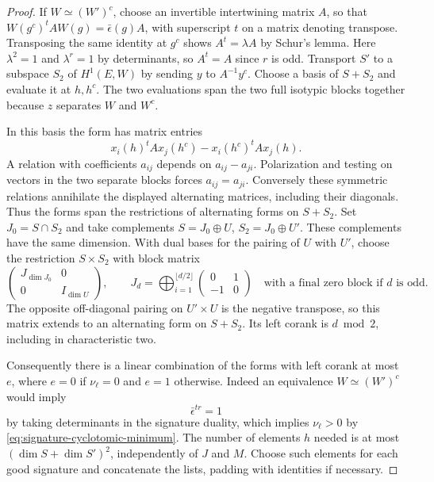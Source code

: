 \begin{proof}
If \(W\simeq(W')^c\), choose an invertible intertwining
matrix \(A\), so that
\(W(g^c)^t A W(g)=\bar\epsilon(g) A\), with superscript
\(t\) on a matrix denoting transpose. Transposing the same
identity at \(g^c\) shows \(A^t=\lambda A\) by Schur's lemma.
Here \(\lambda^2=1\) and \(\lambda^r=1\) by determinants, so
\(A^t=A\) since \(r\) is odd. Transport \(S'\) to a subspace
\(S_2\) of \(H^1(E,W)\) by sending \(y\) to \(A^{-1}y^c\).
Choose a basis of \(S+S_2\) and evaluate it at \(h,h^c\).
The two evaluations span the two full isotypic blocks together
because \(z\) separates \(W\) and \(W^c\).

In this basis the
form has matrix entries
\[
     x_i(h)^t A x_j(h^c)-x_i(h^c)^t A x_j(h).
\]
A relation with coefficients \(a_{ij}\) depends on
\(a_{ij}-a_{ji}\). Polarization and testing on vectors in
the two separate blocks forces \(a_{ij}=a_{ji}\). Conversely
these symmetric relations annihilate the displayed alternating
matrices, including their diagonals. Thus the forms span the restrictions of alternating forms on
\(S+S_2\). Set \(J_0=S\cap S_2\) and take complements
\(S=J_0\oplus U\), \(S_2=J_0\oplus U'\). These complements
have the same dimension. With dual bases for the pairing
of \(U\) with \(U'\), choose the restriction \(S\times S_2\)
with block matrix
\[
 \begin{pmatrix}J_{\dim J_0}&0\\0&I_{\dim U}\end{pmatrix},
 \qquad
 J_d=\bigoplus_{i=1}^{\lfloor d/2\rfloor}
       \begin{pmatrix}0&1\\-1&0\end{pmatrix}
       \quad\text{with a final zero block if \(d\) is odd}.
\]
The opposite off-diagonal pairing on \(U'\times U\) is the
negative transpose, so this matrix extends to an alternating
form on \(S+S_2\). Its left corank is \(d\bmod 2\), including
in characteristic two.

Consequently there is a linear combination of the forms
with left corank at most \(e\), where \(e=0\) if
\(\nu_\ell=0\) and \(e=1\) otherwise. Indeed an equivalence
\(W\simeq(W')^c\) would imply
\[
 \bar\epsilon^{tr}=1
\]
by taking determinants in the signature duality, which
implies \(\nu_\ell>0\) by \eqref{eq:signature-cyclotomic-minimum}.
The number of elements \(h\) needed is at most
\((\dim S+\dim S')^2\), independently of \(J\) and \(M\).
Choose such elements for each good signature and concatenate
the lists, padding with identities if necessary.


\end{proof}
